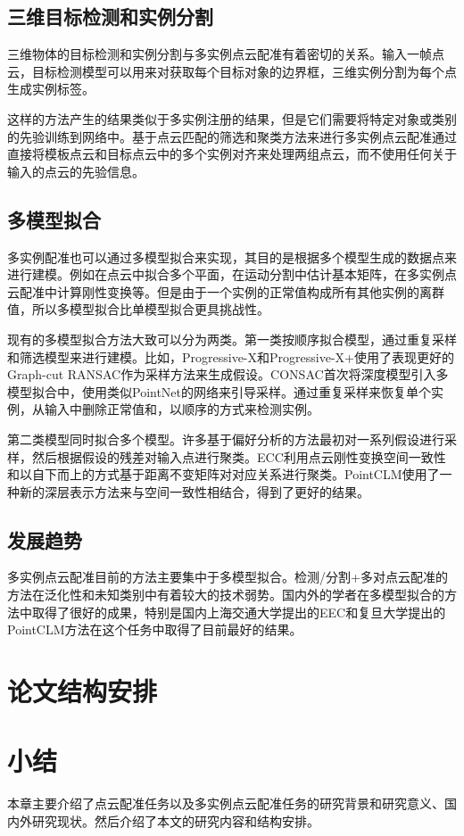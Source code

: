 \subsection{三维目标检测和实例分割}
三维物体的目标检测和实例分割与多实例点云配准有着密切的关系。输入一帧点云，目标检测模型\cite{qi2019deep}可以用来对获取每个目标对象的边界框，三维实例分割\cite{wang2018sgpn,han2020occuseg}为每个点生成实例标签。

这样的方法产生的结果类似于多实例注册的结果，但是它们需要将特定对象或类别的先验训练到网络中。基于点云匹配的筛选和聚类方法来进行多实例点云配准通过直接将模板点云和目标点云中的多个实例对齐来处理两组点云，而不使用任何关于输入的点云的先验信息。

\subsection{多模型拟合}
多实例配准也可以通过多模型拟合来实现，其目的是根据多个模型生成的数据点来进行建模。例如在点云中拟合多个平面\cite{barath2018multi}，在运动分割中估计基本矩阵\cite{hartley1997defense}，在多实例点云配准中计算刚性变换\cite{tang2022multi}等。但是由于一个实例的正常值构成所有其他实例的离群值，所以多模型拟合比单模型拟合更具挑战性。

现有的多模型拟合方法大致可以分为两类。第一类按顺序拟合模型\cite{barath2019progressive,barath2021progressive,kanazawa2004detection,kluger2020consac}，通过重复采样和筛选模型来进行建模。比如，Progressive-X\cite{barath2019progressive}和Progressive-X+\cite{barath2021progressive}使用了表现更好的Graph-cut RANSAC\cite{barath2018graph}作为采样方法来生成假设。CONSAC\cite{kluger2020consac}首次将深度模型引入多模型拟合中，使用类似PointNet\cite{qi2017pointnet}的网络来引导采样。通过重复采样来恢复单个实例，从输入中删除正常值和，以顺序的方式来检测实例。

第二类模型同时拟合多个模型\cite{tang2022multi,toldo2008robust,magri2016multiple,magri2014t,magri2015robust}。许多基于偏好分析的方法\cite{toldo2008robust,magri2015robust}最初对一系列假设进行采样，然后根据假设的残差对输入点进行聚类。ECC\cite{tang2022multi}利用点云刚性变换空间一致性\cite{leordeanu2005spectral}和以自下而上的方式基于距离不变矩阵对对应关系进行聚类。PointCLM\cite{yuan2022pointclm}使用了一种新的深层表示方法来与空间一致性相结合，得到了更好的结果。

\subsection{发展趋势}
多实例点云配准目前的方法主要集中于多模型拟合。检测/分割+多对点云配准的方法在泛化性和未知类别中有着较大的技术弱势。国内外的学者在多模型拟合的方法中取得了很好的成果，特别是国内上海交通大学提出的EEC\cite{tang2022multi}和复旦大学提出的PointCLM\cite{yuan2022pointclm}方法在这个任务中取得了目前最好的结果。

\section{论文结构安排}


\section{小结}
本章主要介绍了点云配准任务以及多实例点云配准任务的研究背景和研究意义、国内外研究现状。然后介绍了本文的研究内容和结构安排。
